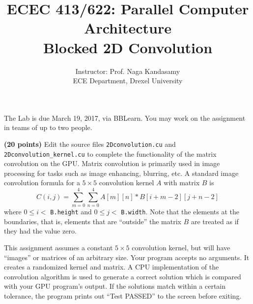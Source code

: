 \documentclass[12pt]{article}
\begin{document}
\title{ECEC 413/622: Parallel Computer Architecture \\ Blocked 2D Convolution}
\author{Instructor: Prof. Naga Kandasamy \\ ECE Department, Drexel University}
\maketitle %
\date{}

\noindent The Lab is due March 19, 2017, via BBLearn. You may work on the assignment in teams of up to two people.
\vspace{12pt}

\textbf{(20 points)} Edit the source files \texttt{2Dconvolution.cu} and \texttt{2Dconvolution\_kernel.cu} to complete the functionality of the matrix convolution on the GPU. Matrix convolution is primarily used in image processing for tasks such as image enhancing, blurring, etc.  A standard image convolution formula for a $5 \times 5$ convolution kernel $A$ with matrix $B$ is
    \begin{equation*}
	C(i,j) = \sum_{m = 0}^4 \sum_{n = 0}^4 A[m][n] * B[i+m-2][j+n-2]
	\end{equation*}
where $0 \leq i <$ \texttt{B.height} and $0 \leq j <$ \texttt{B.width}. Note that the elements at the boundaries, that is, elements that are ``outside'' the matrix $B$ are treated as if they had the value zero. 

This assignment assumes a constant $5 \times 5$ convolution kernel, but will have ``images'' or matrices of an arbitrary size. Your program accepts no arguments. It creates a randomized kernel and matrix. A CPU implementation of the convolution algorithm is used to generate a correct solution which is compared with your GPU program's output. If the solutions match within a certain tolerance, the program prints out ``Test PASSED'' to the screen before exiting. 
\end{document}
